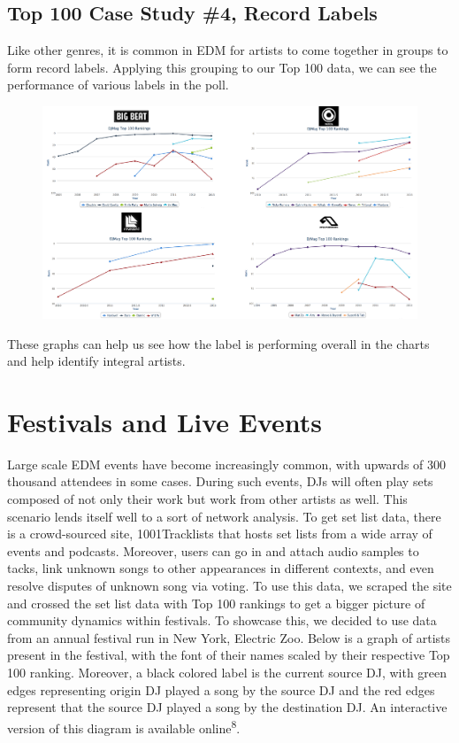 \documentclass[12pt]{dalcsthesis}
\begin{document}
\section{Top 100 Case Study \#4, Record Labels}

Like other genres, it is common in EDM for artists to come together in groups to form record labels. Applying this grouping to our Top 100 data, we can see the performance of various labels in the poll. 

\begin{figure}[h]
\includegraphics[scale=.45]{label_graph}
\centering
\end{figure}

These graphs can help us see how the label is performing overall in the charts and help identify integral artists. 

\chapter{Festivals and Live Events}

Large scale EDM events have become increasingly common, with upwards of 300 thousand attendees in some cases. During such events, DJs will often play sets composed of not only their work but work from other artists as well. This scenario lends itself well to a sort of network analysis. To get set list data, there is a crowd-sourced site, 1001Tracklists that hosts set lists from a wide array of events and podcasts. Moreover, users can go in and attach audio samples to tacks, link unknown songs to other appearances in different contexts, and even resolve disputes of unknown song via voting. To use this data, we scraped the site and crossed the set list data with Top 100 rankings to get a bigger picture of community dynamics within festivals. To showcase this, we decided to use data from an annual festival run in New York, Electric Zoo. Below is a graph of artists present in the festival, with the font of their names scaled by their respective Top 100 ranking. Moreover, a black colored label is the current source DJ, with green edges representing origin DJ played a song by the source DJ and the red edges represent that the source DJ played a song by the destination DJ. An interactive version of this diagram is available online\textsuperscript{8}. 
\end{document}
